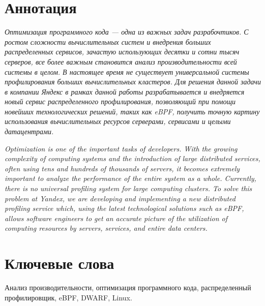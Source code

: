 \section*{Аннотация}
\textit{
    Оптимизация программного кода --- одна из важных задач разрабочтиков.
    С ростом сложности вычислительных систем и внедрения больших распределенных сервисов,
    зачастую использующих десятки и сотни тысяч серверов,
    все более важным становится анализ производительности всей системы в целом.
    В настоящее время не существует универсальной системы профилирования больших вычислительных кластеров.
    Для решения данной задачи в компании Яндекс в рамках данной работы разрабатывается и внедряется новый сервис
    распределенного профилирования, позволяющий при помощи новейших технологических решений, таких как eBPF,
    получить точную картину использования вычислительных ресурсов серверами, сервисами и целыми датацентрами.
}

\vspace{2em}

\textit{
    Optimization is one of the important tasks of developers.
    With the growing complexity of computing systems and the introduction of large distributed services,
    often using tens and hundreds of thousands of servers,
    it becomes extremely important to analyze the performance of the entire system as a whole.
    Currently, there is no universal profiling system for large computing clusters.
    To solve this problem at Yandex, we are developing and implementing a new distributed profiling service
    which, using the latest technological solutions such as eBPF, allows software engineers to get an accurate picture
    of the utilization of computing resources by servers, services, and entire data centers.
}

\section*{Ключевые слова}
Анализ производительности, оптимизация программного кода, распределенный профилировщик, eBPF, DWARF, Linux.
